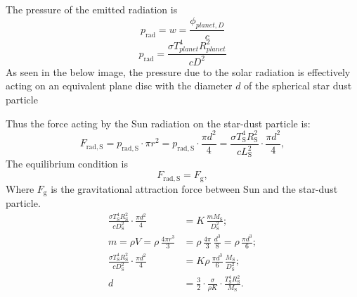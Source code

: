 The pressure of the emitted radiation is
\[ p_{\mathrm{rad}} = w = \frac{\phi_{planet,D}}{c} \]
\[ p_{\mathrm{rad}}
   = \frac{\sigma T_{planet}^4 R_{planet}^2}{cD^2} \tag*{(1)} \]
As seen in the below image, the pressure due to the solar radiation is
effectively acting on an equivalent plane disc with the diameter $d$ of the
spherical star dust particle

Thus the force acting by the Sun radiation on the star-dust particle is:
\[ F_{\mathrm{rad,S}} = p_{\mathrm{rad,S}}\cdot\pi r^2
   = p_{\mathrm{rad,S}}\cdot\frac{\pi d^2}{4}
   = \frac{\sigma T_{\mathrm{S}}^4 R_{\mathrm{S}}^2}{cL_{\mathrm{S}}^2}
     \cdot\frac{\pi d^2}{4}, \]
The equilibrium condition is
\[ F_{\mathrm{rad,S}} = F_{\mathrm{g}}, \]
Where $F_{\mathrm{g}}$ is the gravitational attraction force between Sun and
the star-dust particle.
\begin{align*}
\frac{\sigma T_{\mathrm{S}}^4 R_{\mathrm{S}}^2}{cD_{\mathrm{S}}^2}
  \cdot\frac{\pi d^2}{4}
  &= K\,\frac{m M_{\mathrm{S}}}{D_{\mathrm{S}}^2};\\
m = \rho V = \rho\,\frac{4\pi r^3}{3}
  &= \rho\,\frac{4\pi}{3}\,\frac{d^3}{8}
   = \rho\,\frac{\pi d^3}{6};\\
\frac{\sigma T_{\mathrm{S}}^4 R_{\mathrm{S}}^2}{cD_{\mathrm{S}}^2}
  \cdot\frac{\pi d^2}{4}
  &= K\rho\,\frac{\pi d^3}{6}\,\frac{M_{\mathrm{S}}}{D_{\mathrm{S}}^2};\\
d &= \frac{3}{2}\cdot\frac{\sigma}{\rho K}\cdot
     \frac{T_{\mathrm{S}}^4 R_{\mathrm{S}}^2}{M_{\mathrm{S}}}.
\end{align*}

